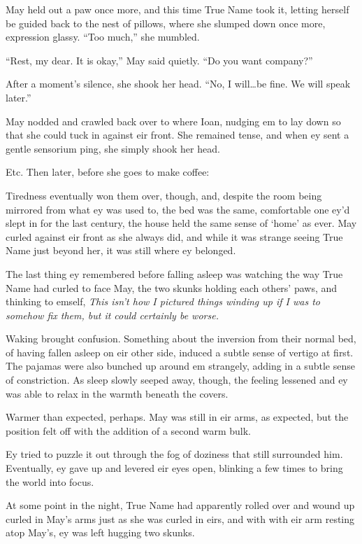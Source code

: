 May held out a paw once more, and this time True Name took it, letting herself be guided back to the nest of pillows, where she slumped down once more, expression glassy. ``Too much,'' she mumbled.

``Rest, my dear. It is okay,'' May said quietly. ``Do you want company?''

After a moment's silence, she shook her head. ``No, I will\ldots be fine. We will speak later.''

May nodded and crawled back over to where Ioan, nudging em to lay down so that she could tuck in against eir front. She remained tense, and when ey sent a gentle sensorium ping, she simply shook her head.

Etc. Then later, before she goes to make coffee:

Tiredness eventually won them over, though, and, despite the room being mirrored from what ey was used to, the bed was the same, comfortable one ey'd slept in for the last century, the house held the same sense of `home' as ever. May curled against eir front as she always did, and while it was strange seeing True Name just beyond her, it was still where ey belonged.

The last thing ey remembered before falling asleep was watching the way True Name had curled to face May, the two skunks holding each others' paws, and thinking to emself, \emph{This isn't how I pictured things winding up if I was to somehow fix them, but it could certainly be worse.}

Waking brought confusion. Something about the inversion from their normal bed, of having fallen asleep on eir other side, induced a subtle sense of vertigo at first. The pajamas were also bunched up around em strangely, adding in a subtle sense of constriction. As sleep slowly seeped away, though, the feeling lessened and ey was able to relax in the warmth beneath the covers.

Warmer than expected, perhaps. May was still in eir arms, as expected, but the position felt off with the addition of a second warm bulk.

Ey tried to puzzle it out through the fog of doziness that still surrounded him. Eventually, ey gave up and levered eir eyes open, blinking a few times to bring the world into focus.

At some point in the night, True Name had apparently rolled over and wound up curled in May's arms just as she was curled in eirs, and with with eir arm resting atop May's, ey was left hugging two skunks.

